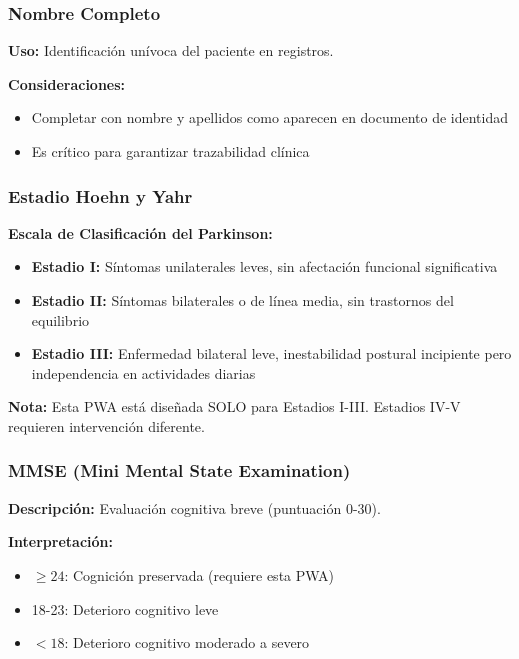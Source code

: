 \documentclass[12pt,a4paper,spanish,oneside]{book}
\begin{document}
\subsubsection{Nombre Completo}

\textbf{Uso:} Identificación unívoca del paciente en registros.

\textbf{Consideraciones:} 
\begin{itemize}
  \item Completar con nombre y apellidos como aparecen en documento de identidad
  \item Es crítico para garantizar trazabilidad clínica
\end{itemize}

\subsubsection{Estadio Hoehn y Yahr}

\textbf{Escala de Clasificación del Parkinson:}

\begin{conceptobox}
  \begin{itemize}
    \item \textbf{Estadio I:} Síntomas unilaterales leves, sin afectación funcional significativa
    \item \textbf{Estadio II:} Síntomas bilaterales o de línea media, sin trastornos del equilibrio
    \item \textbf{Estadio III:} Enfermedad bilateral leve, inestabilidad postural incipiente pero independencia en actividades diarias
  \end{itemize}
  
  \textbf{Nota:} Esta PWA está diseñada SOLO para Estadios I-III. Estadios IV-V requieren intervención diferente.
\end{conceptobox}

\subsubsection{MMSE (Mini Mental State Examination)}

\textbf{Descripción:} Evaluación cognitiva breve (puntuación 0-30).

\textbf{Interpretación:}
\begin{itemize}
  \item $\geq 24$: Cognición preservada (requiere esta PWA)
  \item 18-23: Deterioro cognitivo leve
  \item $<18$: Deterioro cognitivo moderado a severo
\end{itemize}
\end{document}
